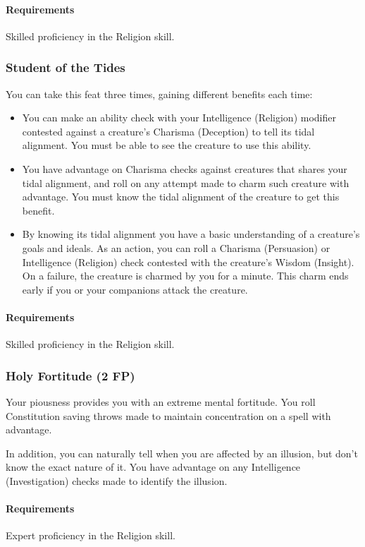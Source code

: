     \paragraph{Requirements} Skilled proficiency in the Religion skill.
\subsubsection{Student of the Tides} \label{feat::studentofthetides}
    You can take this feat three times, gaining different benefits each time:
    \begin{itemize}
        \item You can make an ability check with your Intelligence (Religion) modifier contested against a creature's Charisma (Deception) to tell its tidal alignment.
        You must be able to see the creature to use this ability.
        \item You have advantage on Charisma checks against creatures that shares your tidal alignment, and roll on any attempt made to charm such creature with advantage.
        You must know the tidal alignment of the creature to get this benefit.
        \item By knowing its tidal alignment you have a basic understanding of a creature's goals and ideals.
        As an action, you can roll a Charisma (Persuasion) or Intelligence (Religion) check contested with the creature's Wisdom (Insight).
        On a failure, the creature is charmed by you for a minute.
        This charm ends early if you or your companions attack the creature.
    \end{itemize}
    \paragraph{Requirements} Skilled proficiency in the Religion skill.
\subsubsection{Holy Fortitude (2 FP)} \label{feat::holyfortitude}
    Your piousness provides you with an extreme mental fortitude.
    You roll Constitution saving throws made to maintain concentration on a spell with advantage.

    In addition, you can naturally tell when you are affected by an illusion, but don't know the exact nature of it.
    You have advantage on any Intelligence (Investigation) checks made to identify the illusion.
    \paragraph{Requirements} Expert proficiency in the Religion skill.
